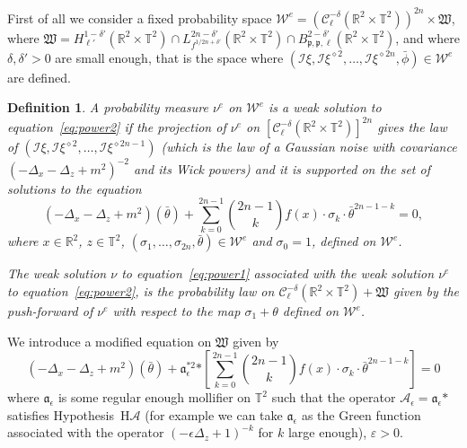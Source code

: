 \documentclass[a4paper,10pt]{article}
\newcommand{\asterisk}{\mathord{*}}
\newtheorem{definition}{Definition}
\begin{document}
First of all we consider a fixed probability space $\mathcal{W}^e =
(\mathcal{C}^{- \delta}_{\ell} (\mathbb{R}^2 \times \mathbb{T}^2))^{2 n}
\times \mathfrak{W}$, where $\mathfrak{W} = H^{1 - \delta'}_{\ell'}
(\mathbb{R}^2 \times \mathbb{T}^2) \cap L^{2 n - \delta'}_{f^{1 / 2 n +
\delta'}} (\mathbb{R}^2 \times \mathbb{T}^2) \cap B^{2 -
\delta'}_{\mathfrak{p}, \mathfrak{p}, \ell} (\mathbb{R}^2 \times
\mathbb{T}^2)$, and where $\delta, \delta' > 0$ are small enough, that is the
space where $(\mathcal{I} \xi, \mathcal{I} \xi^{\diamond 2}, \ldots,
\mathcal{I} \xi^{\diamond 2 n}, \bar{\phi}) \in \mathcal{W}^e$ are defined.

\begin{definition}
  \label{definition_we}A probability measure $\nu^e$ on $\mathcal{W}^e$ is a
  weak solution to equation~{\eqref{eq:power2}} if the projection of $\nu^e$
  on $[\mathcal{C}^{- \delta}_{\ell} (\mathbb{R}^2 \times \mathbb{T}^2)]^{2
  n}$ gives the law of $(\mathcal{I} \xi, \mathcal{I} \xi^{\diamond 2},
  \ldots, \mathcal{I} \xi^{\diamond 2 n - 1})$ (which is the law of a Gaussian
  noise with covariance $(- \Delta_x - \Delta_z + m^2)^{- 2}$ and its Wick
  powers) and it is supported on the set of solutions to the equation
  \begin{equation}
    (- \Delta_x - \Delta_z + m^2) (\bar{\theta}) + \sum_{k = 0}^{2 n - 1}
    \binom{2 n - 1}{k} f (x) \cdot \sigma_k \cdot \bar{\theta}^{2 n - 1 - k} =
    0, \label{eq:power3}
  \end{equation}
  where $x \in \mathbb{R}^2$, $z \in \mathbb{T}^2$, $(\sigma_1, \ldots,
  \sigma_{2 n}, \bar{\theta}) \in \mathcal{W}^e$ and $\sigma_0 = 1$, defined
  on $\mathcal{W}^e$.
  
  The weak solution $\nu$ to equation~{\eqref{eq:power1}} associated with the
  weak solution $\nu^e$ to equation~{\eqref{eq:power2}}, is the probability
  law on $\mathcal{C}^{- \delta}_{\ell} (\mathbb{R}^2 \times \mathbb{T}^2) +
  \mathfrak{W}$ given by the push-forward of $\nu^e$ with respect to the map
  $\sigma_1 + \theta$ defined on $\mathcal{W}^e$.
\end{definition}

We introduce a modified equation on $\mathfrak{W}$ given by
\begin{equation}
  (- \Delta_x - \Delta_z + m^2) (\bar{\theta}) + \mathfrak{a}^{\asterisk
  2}_{\epsilon} \asterisk \left[ \sum_{k = 0}^{2 n - 1} \binom{2 n - 1}{k} f
  (x) \cdot \sigma_k \cdot \bar{\theta}^{2 n - 1 - k} \right] = 0
  \label{eq:power4}
\end{equation}
where $\mathfrak{a}_{\epsilon}$ is some regular enough mollifier on
$\mathbb{T}^2$ such that the operator $\mathcal{A}_{\epsilon} =
\mathfrak{a}_{\epsilon} \asterisk$ satisfies Hypothesis~H$\mathcal{A}$ (for
example we can take $\mathfrak{a}_{\epsilon}$ as the Green function associated
with the operator $(- \epsilon \Delta_z + 1)^{- k}$ for $k$ large enough),
$\varepsilon > 0$. \
\end{document}
